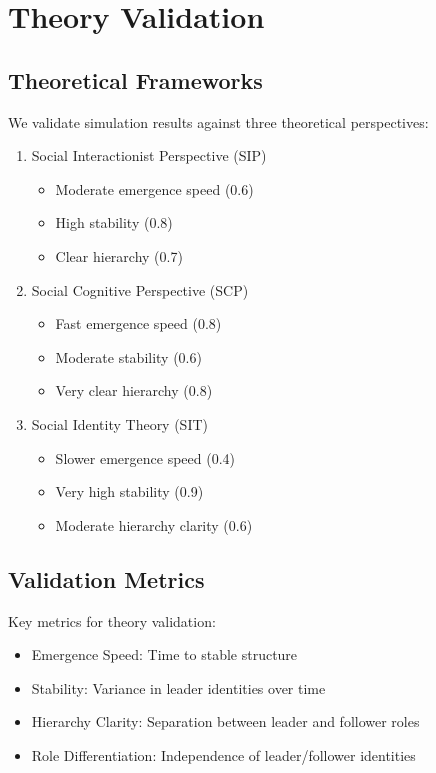 \documentclass[11pt]{article}
\begin{document}
\section{Theory Validation}
\subsection{Theoretical Frameworks}
We validate simulation results against three theoretical perspectives:

\begin{enumerate}
    \item Social Interactionist Perspective (SIP)
    \begin{itemize}
        \item Moderate emergence speed (0.6)
        \item High stability (0.8)
        \item Clear hierarchy (0.7)
    \end{itemize}
    
    \item Social Cognitive Perspective (SCP)
    \begin{itemize}
        \item Fast emergence speed (0.8)
        \item Moderate stability (0.6)
        \item Very clear hierarchy (0.8)
    \end{itemize}
    
    \item Social Identity Theory (SIT)
    \begin{itemize}
        \item Slower emergence speed (0.4)
        \item Very high stability (0.9)
        \item Moderate hierarchy clarity (0.6)
    \end{itemize}
\end{enumerate}

\subsection{Validation Metrics}
Key metrics for theory validation:
\begin{itemize}
    \item Emergence Speed: Time to stable structure
    \item Stability: Variance in leader identities over time
    \item Hierarchy Clarity: Separation between leader and follower roles
    \item Role Differentiation: Independence of leader/follower identities
\end{itemize}
\end{document}
